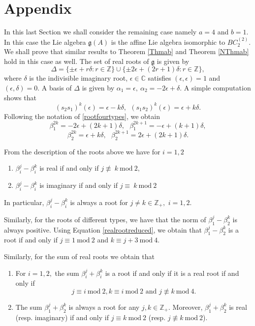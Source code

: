 \documentclass[12pt,reqno]{amsart}
\theoremstyle{plain}
\theoremstyle{definition}
\theoremstyle{remark}
\newcommand{\lie}[1]{\mathfrak{#1}}
\newcommand\bc{\mathbb C}
\newcommand\bz{\mathbb Z}
\begin{document}
\section{Appendix}\label{app}
In this last Section we shall consider the remaining case namely $a=4$ and $b=1.$ In this case the Lie algebra $\lie g(A)$ is the affine Lie algebra isomorphic to $BC_{2}^{(2)}.$ We shall prove that similar results to Theorem \ref{Thmab} and Theorem \ref{NThmab} hold in this case as well. The set of real roots of $\lie g$ is given by \cite{kac1990infinite}
\begin{equation}\label{realrootreduced}
    \Delta=\{\pm\epsilon+r\delta:r\in\bz\}\cup\{\pm2\epsilon+(2r+1)\delta:r\in\bz\},
\end{equation}
 where $\delta$ is the indivisible imaginary root, $\epsilon\in\bc$ satisfies $(\epsilon,\epsilon)=1$ and $(\epsilon,\delta)=0.$ A basis of $\Delta$ is given by $\alpha_1=\epsilon,\ \alpha_2=-2\epsilon+\delta.$ A simple computation shows that $$(s_2s_1)^k(\epsilon)=\epsilon-k\delta,\ \ (s_1s_2)^k(\epsilon)=\epsilon+k\delta.$$
Following the notation of \ref{rootfourtypes}, we obtain
$$\beta_1^{2k}=-2\epsilon+(2k+1)\delta,\ \ \ \beta_1^{2k+1}=-\epsilon+(k+1)\delta,$$
$$\beta_2^{2k}=\epsilon+k\delta,\ \ \ \beta_2^{2k+1}=2\epsilon+(2k+1)\delta.$$

From the description of the roots above we have for $i=1,2$
\begin{enumerate}
    \item $\beta_i^{j}-\beta_i^{k}$ is real if and only if $j\not\equiv\ k\ \mathrm{mod}\ 2,$
    \item $\beta_i^{j}-\beta_i^{k}$ is imaginary if and only if $j\equiv\ k\ \mathrm{mod}\ 2$
\end{enumerate}
In particular, $\beta_i^{j}-\beta_i^{k}$ is always a root for $j\neq k\in\bz_+,$ $i=1,2.$ 

Similarly, for the roots of different types, we have that the norm of $\beta_1^j-\beta_2^k$ is always positive. Using Equation \ref{realrootreduced}, we obtain that $\beta_1^j-\beta_2^k$ is a root if and only if $j\equiv 1\ \mathrm{mod}\ 2$ and $k\equiv j +3\ \mathrm{mod}\ 4.$ 

Similarly, for the sum of real roots we obtain that 
\begin{enumerate}
    \item For $i=1,2,$ the sum $\beta_i^j+\beta_i^k$ is a root if and only if it is a real root if and only if $$j\equiv i\ \mathrm{mod}\ 2, k\equiv i\ \mathrm{mod}\ 2\text{ and } j\not\equiv k\ \mathrm{mod}\ 4.$$
    \item The sum $\beta_1^j+\beta_2^k$ is always a root for any $j,k\in\bz_+.$ Moreover, $\beta_1^j+\beta_2^k$ is real (resp. imaginary) if and only if $j\equiv k\ \mathrm{mod}\ 2$ (resp. $j\not\equiv k\ \mathrm{mod}\ 2$).
\end{enumerate}
\end{document}
